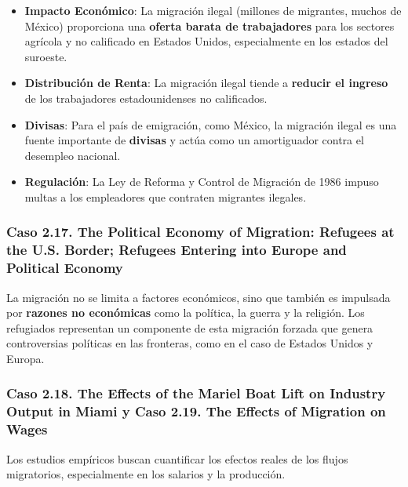 \begin{itemize}
    \item \textbf{Impacto Económico}: La migración ilegal (millones de migrantes, muchos de México) proporciona una \textbf{oferta barata de trabajadores} para los sectores agrícola y no calificado en Estados Unidos, especialmente en los estados del suroeste.
    \item \textbf{Distribución de Renta}: La migración ilegal tiende a \textbf{reducir el ingreso} de los trabajadores estadounidenses no calificados.
    \item \textbf{Divisas}: Para el país de emigración, como México, la migración ilegal es una fuente importante de \textbf{divisas} y actúa como un amortiguador contra el desempleo nacional.
    \item \textbf{Regulación}: La Ley de Reforma y Control de Migración de 1986 impuso multas a los empleadores que contraten migrantes ilegales.
\end{itemize}

\subsubsection{Caso 2.17. The Political Economy of Migration: Refugees at the U.S. Border; Refugees Entering into Europe and Political Economy}
La migración no se limita a factores económicos, sino que también es impulsada por \textbf{razones no económicas} como la política, la guerra y la religión. Los refugiados representan un componente de esta migración forzada que genera controversias políticas en las fronteras, como en el caso de Estados Unidos y Europa.

\subsubsection{Caso 2.18. The Effects of the Mariel Boat Lift on Industry Output in Miami y Caso 2.19. The Effects of Migration on Wages}
Los estudios empíricos buscan cuantificar los efectos reales de los flujos migratorios, especialmente en los salarios y la producción.

